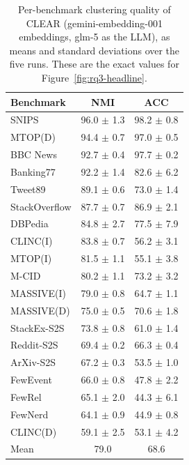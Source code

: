 \documentclass[11pt,a4paper,oneside]{report}
\begin{document}
\begin{table}[htbp]
\centering
\small
\begin{tabular}{lcc}
\toprule
Benchmark & NMI & ACC \\
\midrule
SNIPS & 96.0 $\pm$ 1.3 & 98.2 $\pm$ 0.8 \\
MTOP(D) & 94.4 $\pm$ 0.7 & 97.0 $\pm$ 0.5 \\
BBC News & 92.7 $\pm$ 0.4 & 97.7 $\pm$ 0.2 \\
Banking77 & 92.2 $\pm$ 1.4 & 82.6 $\pm$ 6.2 \\
Tweet89 & 89.1 $\pm$ 0.6 & 73.0 $\pm$ 1.4 \\
StackOverflow & 87.7 $\pm$ 0.7 & 86.9 $\pm$ 2.1 \\
DBPedia & 84.8 $\pm$ 2.7 & 77.5 $\pm$ 7.9 \\
CLINC(I) & 83.8 $\pm$ 0.7 & 56.2 $\pm$ 3.1 \\
MTOP(I) & 81.5 $\pm$ 1.1 & 55.1 $\pm$ 3.8 \\
M-CID & 80.2 $\pm$ 1.1 & 73.2 $\pm$ 3.2 \\
MASSIVE(I) & 79.0 $\pm$ 0.8 & 64.7 $\pm$ 1.1 \\
MASSIVE(D) & 75.0 $\pm$ 0.5 & 70.6 $\pm$ 1.8 \\
StackEx-S2S & 73.8 $\pm$ 0.8 & 61.0 $\pm$ 1.4 \\
Reddit-S2S & 69.4 $\pm$ 0.2 & 66.3 $\pm$ 0.4 \\
ArXiv-S2S & 67.2 $\pm$ 0.3 & 53.5 $\pm$ 1.0 \\
FewEvent & 66.0 $\pm$ 0.8 & 47.8 $\pm$ 2.2 \\
FewRel & 65.1 $\pm$ 2.0 & 44.3 $\pm$ 6.1 \\
FewNerd & 64.1 $\pm$ 0.9 & 44.9 $\pm$ 0.8 \\
CLINC(D) & 59.1 $\pm$ 2.5 & 53.1 $\pm$ 4.2 \\
\midrule
Mean & 79.0 & 68.6 \\
\bottomrule
\end{tabular}
\caption[CLEAR per-benchmark scores]{Per-benchmark clustering quality of CLEAR ({\small\ttfamily gemini-embedding-001} embeddings, {\small\ttfamily glm-5} as the LLM), as means and standard deviations over the five runs. These are the exact values for Figure~\ref{fig:rq3-headline}.}
\label{tab:rq3-headline}
\end{table}
\end{document}
